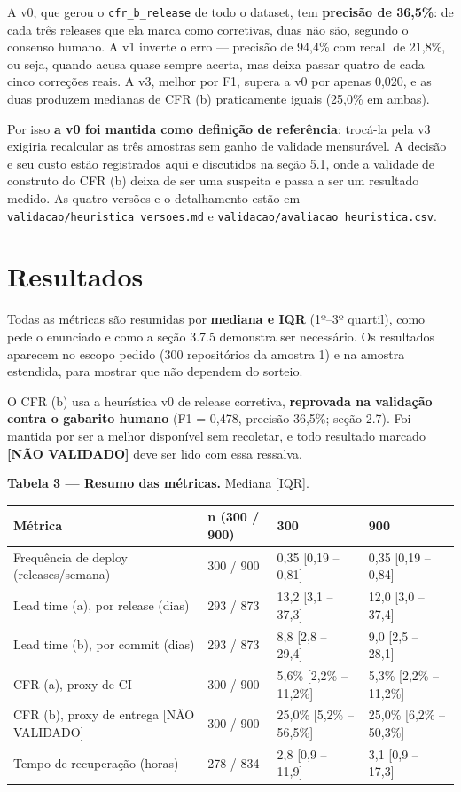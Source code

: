 \documentclass[12pt]{article}
\begin{document}
A v0, que gerou o \texttt{cfr\_b\_release} de todo o dataset, tem \textbf{precisão de 36,5\%}: de cada três releases que ela marca como corretivas, duas não são, segundo o consenso humano. A v1 inverte o erro — precisão de 94,4\% com recall de 21,8\%, ou seja, quando acusa quase sempre acerta, mas deixa passar quatro de cada cinco correções reais. A v3, melhor por F1, supera a v0 por apenas 0,020, e as duas produzem medianas de CFR (b) praticamente iguais (25,0\% em ambas).

Por isso \textbf{a v0 foi mantida como definição de referência}: trocá-la pela v3 exigiria recalcular as três amostras sem ganho de validade mensurável. A decisão e seu custo estão registrados aqui e discutidos na seção 5.1, onde a validade de construto do CFR (b) deixa de ser uma suspeita e passa a ser um resultado medido. As quatro versões e o detalhamento estão em \texttt{validacao/heuristica\_versoes.md} e \texttt{validacao/avaliacao\_heuristica.csv}.


\section{Resultados}

Todas as métricas são resumidas por \textbf{mediana e IQR} (1º–3º quartil), como pede o enunciado e como a seção 3.7.5 demonstra ser necessário. Os resultados aparecem no escopo pedido (300 repositórios da amostra 1) e na amostra estendida, para mostrar que não dependem do sorteio.

O CFR (b) usa a heurística v0 de release corretiva, \textbf{reprovada na validação contra o gabarito humano} (F1 = 0,478, precisão 36,5\%; seção 2.7). Foi mantida por ser a melhor disponível sem recoletar, e todo resultado marcado \textbf{[NÃO VALIDADO]} deve ser lido com essa ressalva.

\textbf{Tabela 3 — Resumo das métricas.} Mediana [IQR].

\begin{table}[!htbp]
\centering
\scriptsize
\begin{tabular}{p{}p{}p{}p{}}
\toprule
\textbf{Métrica} & \textbf{n (300 / 900)} & \textbf{300} & \textbf{900} \\
\midrule
Frequência de deploy (releases/semana) & 300 / 900 & 0,35 [0,19 – 0,81] & 0,35 [0,19 – 0,84] \\
Lead time (a), por release (dias) & 293 / 873 & 13,2 [3,1 – 37,3] & 12,0 [3,0 – 37,4] \\
Lead time (b), por commit (dias) & 293 / 873 & 8,8 [2,8 – 29,4] & 9,0 [2,5 – 28,1] \\
CFR (a), proxy de CI & 300 / 900 & 5,6\% [2,2\% – 11,2\%] & 5,3\% [2,2\% – 11,2\%] \\
CFR (b), proxy de entrega [NÃO VALIDADO] & 300 / 900 & 25,0\% [5,2\% – 56,5\%] & 25,0\% [6,2\% – 50,3\%] \\
Tempo de recuperação (horas) & 278 / 834 & 2,8 [0,9 – 11,9] & 3,1 [0,9 – 17,3] \\
\bottomrule
\end{tabular}
\end{table}
\end{document}
